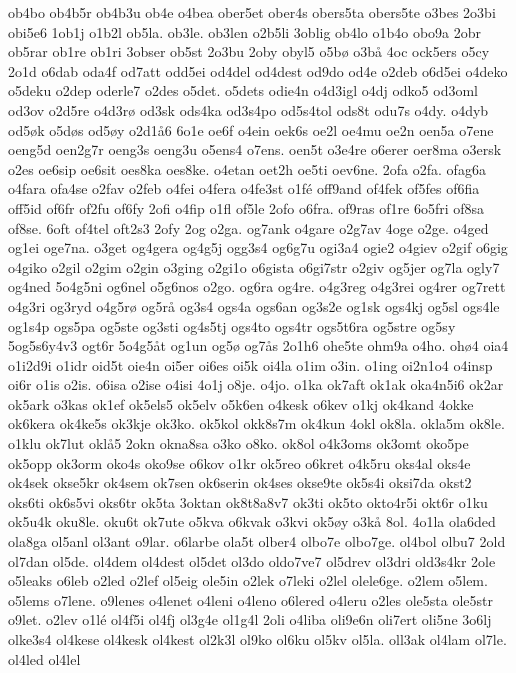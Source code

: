 {ob4bo
ob4b5r
ob4b3u
ob4e
o4bea
ober5et
ober4s
obers5ta
obers5te
o3bes
2o3bi
obi5e6
1ob1j
o1b2l
ob5la.
ob3le.
ob3len
o2b5li
3oblig
ob4lo
o1b4o
obo9a
2obr
ob5rar
ob1re
ob1ri
3obser
ob5st
2o3bu
2oby
obyl5
o5bø
o3bå
4oc
ock5ers
o5cy
2o1d
o6dab
oda4f
od7att
odd5ei
od4del
od4dest
od9do
od4e
o2deb
o6d5ei
o4deko
o5deku
o2dep
oderle7
o2des
o5det.
o5dets
odie4n
o4d3igl
o4dj
odko5
od3oml
od3ov
o2d5re
o4d3rø
od3sk
ods4ka
od3s4po
od5s4tol
ods8t
odu7s
o4dy.
o4dyb
od5øk
o5døs
od5øy
o2d1å6
6o1e
oe6f
o4ein
oek6s
oe2l
oe4mu
oe2n
oen5a
o7ene
oeng5d
oen2g7r
oeng3s
oeng3u
o5ens4
o7ens.
oen5t
o3e4re
o6erer
oer8ma
o3ersk
o2es
oe6sip
oe6sit
oes8ka
oes8ke.
o4etan
oet2h
oe5ti
oev6ne.
2ofa
o2fa.
ofag6a
o4fara
ofa4se
o2fav
o2feb
o4fei
o4fera
o4fe3st
o1fé
off9and
of4fek
of5fes
of6fia
off5id
of6fr
of2fu
of6fy
2ofi
o4fip
o1fl
of5le
2ofo
o6fra.
of9ras
of1re
6o5fri
of8sa
of8se.
6oft
of4tel
oft2s3
2ofy
2og
o2ga.
og7ank
o4gare
o2g7av
4oge
o2ge.
o4ged
og1ei
oge7na.
o3get
og4gera
og4g5j
ogg3s4
og6g7u
ogi3a4
ogie2
o4giev
o2gif
o6gig
o4giko
o2gil
o2gim
o2gin
o3ging
o2gi1o
o6gista
o6gi7str
o2giv
og5jer
og7la
ogly7
og4ned
5o4g5ni
og6nel
o5g6nos
o2go.
og6ra
og4re.
o4g3reg
o4g3rei
og4rer
og7rett
o4g3ri
og3ryd
o4g5rø
og5rå
og3s4
ogs4a
ogs6an
og3s2e
og1sk
ogs4kj
og5sl
ogs4le
og1s4p
ogs5pa
og5ste
og3sti
og4s5tj
ogs4to
ogs4tr
ogs5t6ra
og5stre
og5sy
5og5s6y4v3
ogt6r
5o4g5åt
og1un
og5ø
og7ås
2o1h6
ohe5te
ohm9a
o4ho.
ohø4
oia4
o1i2d9i
o1idr
oid5t
oie4n
oi5er
oi6es
oi5k
oi4la
o1im
o3in.
o1ing
oi2n1o4
o4insp
oi6r
o1is
o2is.
o6isa
o2ise
o4isi
4o1j
o8je.
o4jo.
o1ka
ok7aft
ok1ak
oka4n5i6
ok2ar
ok5ark
o3kas
ok1ef
ok5els5
ok5elv
o5k6en
o4kesk
o6kev
o1kj
ok4kand
4okke
ok6kera
ok4ke5s
ok3kje
ok3ko.
ok5kol
okk8s7m
ok4kun
4okl
ok8la.
okla5m
ok8le.
o1klu
ok7lut
oklå5
2okn
okna8sa
o3ko
o8ko.
ok8ol
o4k3oms
ok3omt
oko5pe
ok5opp
ok3orm
oko4s
oko9se
o6kov
o1kr
ok5reo
o6kret
o4k5ru
oks4al
oks4e
ok4sek
okse5kr
ok4sem
ok7sen
ok6serin
ok4ses
okse9te
ok5s4i
oksi7da
okst2
oks6ti
ok6s5vi
oks6tr
ok5ta
3oktan
ok8t8a8v7
ok3ti
ok5to
okto4r5i
okt6r
o1ku
ok5u4k
oku8le.
oku6t
ok7ute
o5kva
o6kvak
o3kvi
ok5øy
o3kå
8ol.
4o1la
ola6ded
ola8ga
ol5anl
ol3ant
o9lar.
o6larbe
ola5t
olber4
olbo7e
olbo7ge.
ol4bol
olbu7
2old
ol7dan
ol5de.
ol4dem
ol4dest
ol5det
ol3do
oldo7ve7
ol5drev
ol3dri
old3s4kr
2ole
o5leaks
o6leb
o2led
o2lef
ol5eig
ole5in
o2lek
o7leki
o2lel
olele6ge.
o2lem
o5lem.
o5lems
o7lene.
o9lenes
o4lenet
o4leni
o4leno
o6lered
o4leru
o2les
ole5sta
ole5str
o9let.
o2lev
o1lé
ol4f5i
ol4fj
ol3g4e
ol1g4l
2oli
o4liba
oli9e6n
oli7ert
oli5ne
3o6lj
olke3s4
ol4kese
ol4kesk
ol4kest
ol2k3l
ol9ko
ol6ku
ol5kv
ol5la.
oll3ak
ol4lam
ol7le.
ol4led
ol4lel
}
